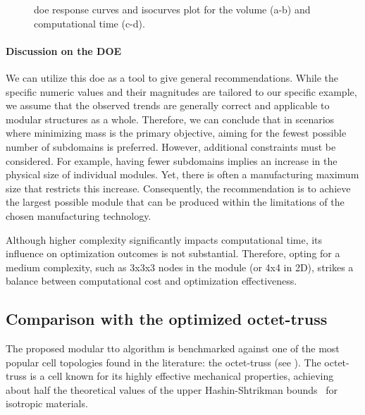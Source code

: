 \begin{figure}
    \hfill
    \hspace*{\fill}
    \caption{\acrfull{doe} response curves and isocurves plot for the volume (a-b) and computational time (c-d).}
    \label{fig:05_doe}
\end{figure}

\paragraph{Discussion on the DOE}
We can utilize this \gls{doe} as a tool to give general recommendations. While the specific numeric values and their magnitudes are tailored to our specific example, we assume that the observed trends are generally correct and applicable to modular structures as a whole. Therefore, we can conclude that in scenarios where minimizing mass is the primary objective, aiming for the fewest possible number of subdomains is preferred. However, additional constraints must be considered. For example, having fewer subdomains implies an increase in the physical size of individual modules. Yet, there is often a manufacturing maximum size that restricts this increase. Consequently, the recommendation is to achieve the largest possible module that can be produced within the limitations of the chosen manufacturing technology.

Although higher complexity significantly impacts computational time, its influence on optimization outcomes is not substantial. Therefore, opting for a medium complexity, such as 3x3x3 nodes in the module (or 4x4 in 2D), strikes a balance between computational cost and optimization effectiveness.

\subsection{Comparison with the optimized octet-truss}
The proposed modular \gls{tto} algorithm is benchmarked against one of the most popular cell topologies found in the literature: the octet-truss (see ). The octet-truss is a cell known for its highly effective mechanical properties, achieving about half the theoretical values of the upper Hashin-Shtrikman bounds~ for isotropic materials.

